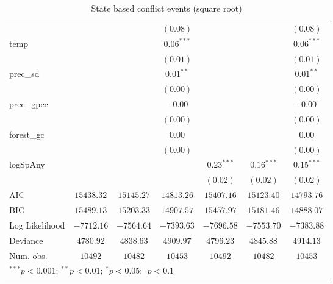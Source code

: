 \begin{sidewaystable}
\begin{center}
{\begin{tabular}{l c c c c c c}
                &               &                & $(0.08)$      &               &                & $(0.08)$        \\
temp            &               &                & $0.06^{***}$  &               &                & $0.06^{***}$    \\
                &               &                & $(0.01)$      &               &                & $(0.01)$        \\
prec\_sd        &               &                & $0.01^{**}$   &               &                & $0.01^{**}$     \\
                &               &                & $(0.00)$      &               &                & $(0.00)$        \\
prec\_gpcc      &               &                & $-0.00$       &               &                & $-0.00^{\cdot}$ \\
                &               &                & $(0.00)$      &               &                & $(0.00)$        \\
forest\_gc      &               &                & $0.00$        &               &                & $0.00$          \\
                &               &                & $(0.00)$      &               &                & $(0.00)$        \\
logSpAny        &               &                &               & $0.23^{***}$  & $0.16^{***}$   & $0.15^{***}$    \\
                &               &                &               & $(0.02)$      & $(0.02)$       & $(0.02)$        \\
\hline
AIC             & $15438.32$    & $15145.27$     & $14813.26$    & $15407.16$    & $15123.40$     & $14793.76$      \\
BIC             & $15489.13$    & $15203.33$     & $14907.57$    & $15457.97$    & $15181.46$     & $14888.07$      \\
Log Likelihood  & $-7712.16$    & $-7564.64$     & $-7393.63$    & $-7696.58$    & $-7553.70$     & $-7383.88$      \\
Deviance        & $4780.92$     & $4838.63$      & $4909.97$     & $4796.23$     & $4845.88$      & $4914.13$       \\
Num. obs.       & $10492$       & $10482$        & $10453$       & $10492$       & $10482$        & $10453$         \\
\hline
\multicolumn{7}{l}{\scriptsize{$^{***}p<0.001$; $^{**}p<0.01$; $^{*}p<0.05$; $^{\cdot}p<0.1$}}
\end{tabular}
}
\caption{State based conflict events (square root)}
\label{sqrtState_based}
\end{center}
\end{sidewaystable}
